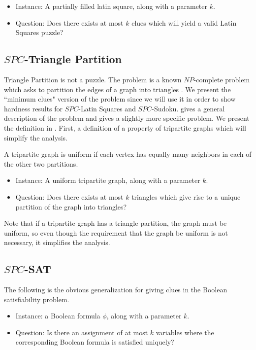 \documentclass[runningheads,a4paper]{llncs}
\begin{document}
\begin{itemize}
\item Instance: A partially filled latin square, along with a parameter $k$. 
\item Question: Does there exists at most $k$ clues which will yield a valid Latin Squares puzzle?
\end{itemize}

\subsection{$SPC$-Triangle Partition}

Triangle Partition is not a puzzle. The problem is a known $NP$-complete problem which asks to partition the edges of a graph into triangles \cite{holyer1981np}. We present the ``minimum clues" version of the problem since we will use it in order to show hardness results for $SPC$-Latin Squares and $SPC$-Sudoku. \cite{holyer1981np} gives a general description of the problem and \cite{colbourn1984complexity} gives a slightly more specific problem. We present the definition in \cite{colbourn1984complexity}. First, a definition of a property of tripartite graphs which will simplify the analysis.

\begin{definition}
A tripartite graph is uniform if each vertex has equally many neighbors in each of the other two partitions.
\end{definition}

\begin{itemize}
\item Instance: A uniform tripartite graph, along with a parameter $k$.
\item Question: Does there exists at most $k$ triangles which give rise to a unique partition of the graph into triangles?
\end{itemize}

Note that if a tripartite graph has a triangle partition, the graph must be uniform, so even though the requirement that the graph be uniform is not necessary, it simplifies the analysis.

\subsection{$SPC$-SAT}

The following is the obvious generalization for giving clues in the Boolean satisfiability problem.

\begin{itemize}
\item Instance: a Boolean formula $\phi$, along with a parameter $k$.
\item Question: Is there an assignment of at most $k$ variables where the corresponding Boolean formula is satisfied uniquely?
\end{itemize}
\end{document}
